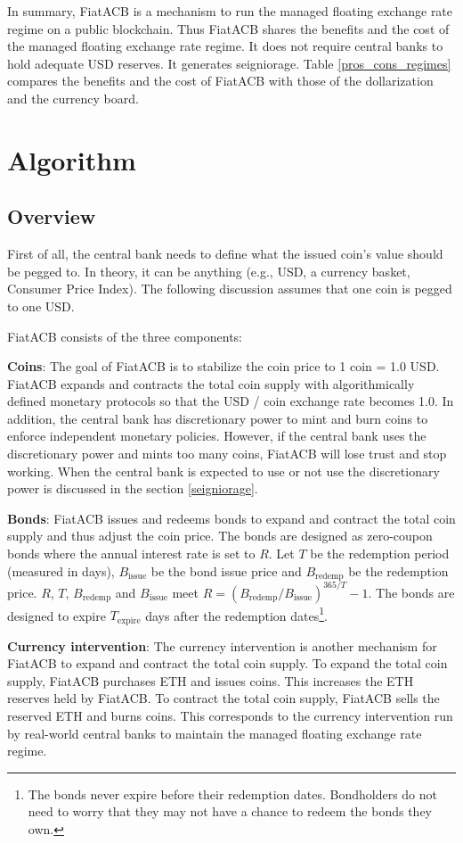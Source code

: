 \documentclass[dvipdfmx,a4paper]{article}
\begin{document}
In summary, FiatACB is a mechanism to run the managed floating exchange rate regime on a public blockchain. Thus FiatACB shares the benefits and the cost of the managed floating exchange rate regime. It does not require central banks to hold adequate USD reserves. It generates seigniorage. Table \ref{pros_cons_regimes} compares the benefits and the cost of FiatACB with those of the dollarization and the currency board.

\section{Algorithm}

\subsection{Overview}

First of all, the central bank needs to define what the issued coin's value should be pegged to. In theory, it can be anything (e.g., USD, a currency basket, Consumer Price Index). The following discussion assumes that one coin is pegged to one USD.

FiatACB consists of the three components:

\begin{description}
\item{\textbf{Coins}}: The goal of FiatACB is to stabilize the coin price to 1 coin = 1.0 USD. FiatACB expands and contracts the total coin supply with algorithmically defined monetary protocols so that the USD / coin exchange rate becomes 1.0. In addition, the central bank has discretionary power to mint and burn coins to enforce independent monetary policies. However, if the central bank uses the discretionary power and mints too many coins, FiatACB will lose trust and stop working. When the central bank is expected to use or not use the discretionary power is discussed in the section \ref{seigniorage}.
\item{\textbf{Bonds}}: FiatACB issues and redeems bonds to expand and contract the total coin supply and thus adjust the coin price. The bonds are designed as zero-coupon bonds where the annual interest rate is set to $R$. Let $T$ be the redemption period (measured in days), $B_{\mathrm{issue}}$ be the bond issue price and $B_{\mathrm{redemp}}$ be the redemption price. $R$, $T$, $B_{\mathrm{redemp}}$ and $B_{\mathrm{issue}}$ meet $R=(B_{\mathrm{redemp}}/B_{\mathrm{issue}})^{365/T}-1$. The bonds are designed to expire $T_{\mathrm{expire}}$ days after the redemption dates\footnote{The bonds never expire before their redemption dates. Bondholders do not need to worry that they may not have a chance to redeem the bonds they own.}.
\item{\textbf{Currency intervention}}: The currency intervention is another mechanism for FiatACB to expand and contract the total coin supply. To expand the total coin supply, FiatACB purchases ETH and issues coins. This increases the ETH reserves held by FiatACB. To contract the total coin supply, FiatACB sells the reserved ETH and burns coins. This corresponds to the currency intervention run by real-world central banks to maintain the managed floating exchange rate regime.
\end{description}
\end{document}
